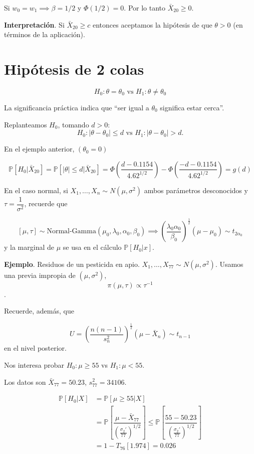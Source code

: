 \documentclass[
  12pt,
]{book}
\begin{document}
Si \(w_0 = w_1 \implies \beta = 1/2\) y \(\Phi(1/2) =0\). Por lo tanto \(\bar X_{20}\geq 0\).

\textbf{Interpretación}. Si \(\bar X_{20}\geq c\) entonces aceptamos la hipótesis de que \(\theta>0\) (en términos de la aplicación).

\hypertarget{hipuxf3tesis-de-2-colas}{%
\section{Hipótesis de 2 colas}\label{hipuxf3tesis-de-2-colas}}

\[H_0: \theta = \theta_0 \text{ vs } H_1:\theta \ne \theta_0\]

La significancia práctica indica que ``ser igual a \(\theta_0\) significa estar cerca''.

Replanteamos \(H_0\), tomando \(d>0\):
\[H_0: |\theta-\theta_0|\leq d \text{ vs } H_1: |\theta-\theta_0|>d.\]

En el ejemplo anterior, \((\theta_0 = 0)\)

\[\mathbb P[H_0|\bar X_{20}]=\mathbb P[|\theta|\leq d|\bar X_{20}] = \Phi\left(\dfrac{d-0.1154}{4.62^{1/2}}\right) - \Phi\left(\dfrac{-d-0.1154}{4.62^{1/2}}\right) = g(d)\]

En el caso normal, si \(X_1,\dots,X_n\sim N(\mu,\sigma^2)\) ambos parámetros desconocidos y \(\tau = \dfrac 1{\sigma^2}\), recuerde que

\[[\mu,\tau]\sim \text{Normal-Gamma}(\mu_0,\lambda_0,\alpha_0,\beta_0)\implies \left(\dfrac{\lambda_0\alpha_0}{\beta_0}\right)^{\frac 12}(\mu-\mu_0)\sim t_{2\alpha_0}\]
y la marginal de \(\mu\) se usa en el cálculo \(\mathbb P[H_0|x]\).

\textbf{Ejemplo}. Residuos de un pesticida en apio. \(X_1,\dots, X_{77}\sim N(\mu,\sigma^2)\). Usamos una previa impropia de \((\mu,\sigma^2)\),
\[\pi(\mu,\tau)\propto \tau^{-1}\].

Recuerde, además, que

\[U = \left(\dfrac{n(n-1)}{s_n^2}\right)^{\frac 12}(\mu-\bar X_n)\sim t_{n-1}\]
en el nivel posterior.

Nos interesa probar \(H_0: \mu\geq 55\) vs \(H_1:\mu<55\).

Los datos son \(\bar X_{77} = 50.23\), \(s_{77}^2=34106\).

\begin{align*}
\mathbb P[H_0|X] & = \mathbb P[\mu\geq 55|X] \\ & = \mathbb P\left[\dfrac{\mu-\bar X_{77}}{\left(\frac{\sigma_2'}{77}\right)^{1/2}}\right] \leq \mathbb P\left[\dfrac{55-50.23}{\left(\frac{\sigma_2'}{77}\right)^{1/2}}\right] \\ & = 1-T_{76}[1.974] = 0.026
\end{align*}
\end{document}
